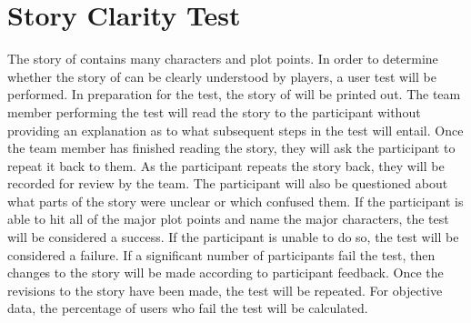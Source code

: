 \section{Story Clarity Test}

The story of \ourgame{} contains many characters and plot points. In order to determine whether the story of \ourgame{} can be clearly understood by players, a user test will be performed. In preparation for the test, the story of \ourgame{} will be printed out. The team member performing the test will read the story to the participant without providing an explanation as to what subsequent steps in the test will entail. Once the team member has finished reading the story, they will ask the participant to repeat it back to them. As the participant repeats the story back, they will be recorded for review by the team. The participant will also be questioned about what parts of the story were unclear or which confused them. If the participant is able to hit all of the major plot points and name the major characters, the test will be considered a success. If the participant is unable to do so, the test will be considered a failure. If a significant number of participants fail the test, then changes to the story will be made according to participant feedback. Once the revisions to the story have been made, the test will be repeated. For objective data, the percentage of users who fail the test will be calculated.